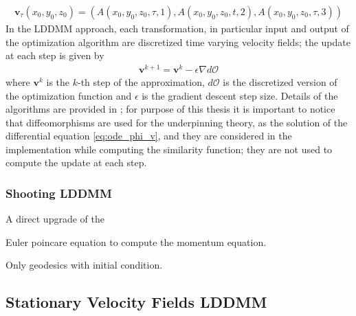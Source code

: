 \begin{align*}
\mathbf{v}_{\tau}(x_0,y_0,z_0) = (A(x_0,y_0,z_0,\tau,1), A(x_0,y_0,z_0,t,2), A(x_0,y_0,z_0,\tau,3))
\end{align*}
In the LDDMM approach, each transformation, in particular input and output of the optimization algorithm are discretized time varying velocity fields; the update at each step is given by
\begin{align*}
\mathbf{v}^{k+1} = \mathbf{v}^{k} - \epsilon \nabla d\mathcal{O}
\end{align*}
where $\mathbf{v}^{k}$ is the $k$-th step of the approximation, $d\mathcal{O}$ is the discretized version of the optimization function and $\epsilon$ is the gradient descent step size.
Details of the algorithms are provided in \cite{beg2005computing}; for purpose of this thesis it is important to notice that diffeomorphisms are used for the underpinning theory, as the solution of the differential equation \ref{eq:ode_phi_v}, and they are considered in the implementation while computing the similarity function; they are not used to compute the update at each step.

\subsubsection{Shooting LDDMM}

A direct upgrade of the 

Euler poincare equation to compute the momentum equation.


Only geodesics with initial condition.


\cite{vialard2012diffeomorphic}




\subsection{Stationary Velocity Fields LDDMM}




